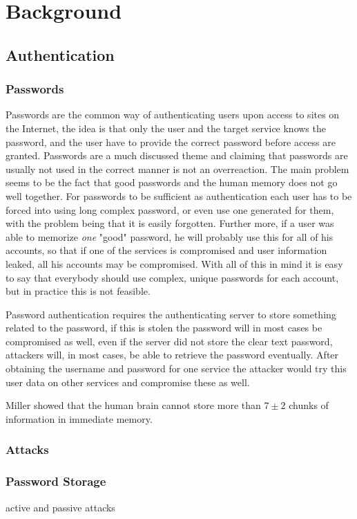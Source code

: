 \chapter{Background}\label{chp:background}

\section{Authentication}

\subsection{Passwords}
Passwords are the common way of authenticating users upon access to sites on the Internet, the idea is that only the user and the target service knows the password, and the user have to provide the correct password before access are granted. Passwords are a much discussed theme and claiming that passwords are usually not used in the correct manner is not an overreaction. The main problem seems to be the fact that good passwords and the human memory does not go well together. For passwords to be sufficient as authentication each user has to be forced into using long complex password, or even use one generated for them, with the problem being that it is easily forgotten. Further more, if a user was able to memorize \emph{one} "good" password, he will probably use this for all of his accounts, so that if one of the services is compromised and user information leaked, all his accounts may be compromised. With all of this in mind it is easy to say that everybody should use complex, unique passwords for each account, but in practice this is not feasible.
\par Password authentication requires the authenticating server to store something related to the password, if this is stolen the password will in most cases be compromised as well, even if the server did not store the clear text password, attackers will, in most cases, be able to retrieve the password eventually. After obtaining the username and password for one service the attacker would try this user data on other services and compromise these as well. 

Miller \cite{magic-seven_miller} showed that the human brain cannot store more than $7\pm 2$ chunks of information in immediate memory.
\subsection{Attacks}
\subsection{Password Storage}
active and passive attacks  
